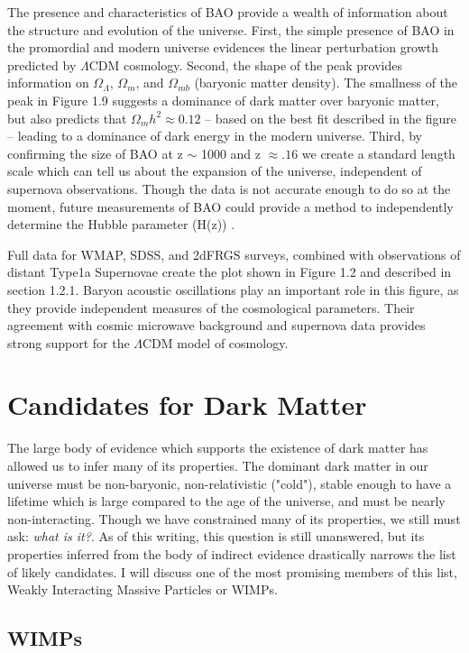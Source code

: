 \documentclass{report}
\begin{document}
The presence and characteristics of BAO provide a wealth of information about the structure and evolution of the universe. First, the simple presence of BAO in the promordial and modern universe evidences the linear perturbation growth predicted by $\Lambda$CDM cosmology. Second, the shape of the peak provides information on $\Omega_{\Lambda}$, $\Omega_{m}$, and $\Omega_{mb}$ (baryonic matter density). The smallness of the peak in Figure 1.9 suggests a dominance of dark matter over baryonic matter, but also predicts that $\Omega_{m}h^2 \approx 0.12$ -- based on the best fit described in the figure -- leading to a dominance of dark energy in the modern universe. Third, by confirming the size of BAO at z $\sim$ 1000 and z $\approx .16$ we create a standard length scale which can tell us about the expansion of the universe, independent of supernova observations. Though the data is not accurate enough to do so at the moment, future measurements of BAO could provide a method to independently determine the Hubble parameter (H(z)) \cite{Eisenstein2005}.

Full data for WMAP, SDSS, and 2dFRGS surveys, combined with observations of distant Type1a Supernovae create the plot shown in Figure 1.2 and described in section 1.2.1. Baryon acoustic oscillations play an important role in this figure, as they provide independent measures of the cosmological parameters. Their agreement with cosmic microwave background and supernova data provides strong support for the $\Lambda$CDM model of cosmology.

\section{Candidates for Dark Matter}

The large body of evidence which supports the existence of dark matter has allowed us to infer many of its properties. The dominant dark matter in our universe must be non-baryonic, non-relativistic ("cold"), stable enough to have a lifetime which is large compared to the age of the universe, and must be nearly non-interacting. Though we have constrained many of its properties, we still must ask: \emph{what is it?}. As of this writing, this question is still unanswered, but its properties inferred from the body of indirect evidence drastically narrows the list of likely candidates. I will discuss one of the most promising members of this list, Weakly Interacting Massive Particles or WIMPs.

\subsection{WIMPs}
\end{document}
